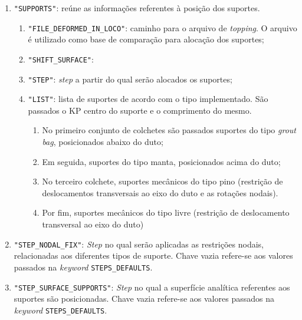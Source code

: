 \begin{enumerate}
    \item \texttt{"SUPPORTS"}: reúne as informações referentes à posição dos suportes.
    \begin{enumerate}
        \item \texttt{"FILE\_DEFORMED\_IN\_LOCO"}: caminho para o arquivo de \textit{topping}. O arquivo é utilizado como base de comparação para alocação dos suportes;
        \item \texttt{"SHIFT\_SURFACE"}: %
        \item \texttt{"STEP"}: \textit{step} a partir do qual serão alocados os suportes;
        \item \texttt{"LIST"}: lista de suportes de acordo com o tipo implementado. São passados o KP centro do suporte e o comprimento do mesmo.
        \begin{enumerate}
            \item No primeiro conjunto de colchetes são passados suportes do tipo \textit{grout bag}, posicionados abaixo do duto;
            \item Em seguida, suportes do tipo manta, posicionados acima do duto;
            \item No terceiro colchete, suportes mecânicos do tipo pino (restrição de deslocamentos transversais ao eixo do duto e as rotações nodais).
            \item Por fim, suportes mecânicos do tipo livre (restrição de deslocamento transversal ao eixo do duto)
        \end{enumerate}
    \end{enumerate}
    \item \texttt{"STEP\_NODAL\_FIX"}: \textit{Step} no qual serão aplicadas as restrições nodais, relacionadas aos diferentes tipos de suporte. Chave vazia refere-se aos valores passados na \textit{keyword} \texttt{STEPS\_DEFAULTS}.
    \item \texttt{"STEP\_SURFACE\_SUPPORTS"}: \textit{Step} no qual a superfície analítica referentes aos suportes são posicionadas. Chave vazia refere-se aos valores passados na \textit{keyword} \texttt{STEPS\_DEFAULTS}.
\end{enumerate}

